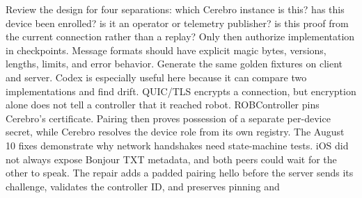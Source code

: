 {}Review the design for four separations:\markdownRendererInterblockSeparator
{}\markdownRendererUlBegin
\markdownRendererUlItem {} which Cerebro instance is this?\markdownRendererUlItemEnd 
\markdownRendererUlItem {} has this device been enrolled?\markdownRendererUlItemEnd 
\markdownRendererUlItem {} is it an operator or telemetry publisher?\markdownRendererUlItemEnd 
\markdownRendererUlItem {} is this proof from the current connection rather than a replay?\markdownRendererUlItemEnd 
\markdownRendererUlEnd \markdownRendererInterblockSeparator
{}Only then authorize implementation in checkpoints.\markdownRendererInterblockSeparator
{}
\markdownRendererSectionEnd \markdownRendererSectionBegin
{}\markdownRendererInterblockSeparator
{}Message formats should have explicit magic bytes, versions, lengths, limits,\markdownRendererSoftLineBreak
{}and error behavior. Generate the same golden fixtures on client and server.\markdownRendererSoftLineBreak
{}Codex is especially useful here because it can compare two implementations and\markdownRendererSoftLineBreak
{}find drift.\markdownRendererInterblockSeparator
{}\markdownRendererInterblockSeparator
{}
\markdownRendererSectionEnd \markdownRendererSectionBegin
{}\markdownRendererInterblockSeparator
{}QUIC/TLS encrypts a connection, but encryption alone does not tell a controller\markdownRendererSoftLineBreak
{}that it reached  robot. ROBController pins Cerebro's certificate. Pairing\markdownRendererSoftLineBreak
{}then proves possession of a separate per-device secret, while Cerebro resolves\markdownRendererSoftLineBreak
{}the device role from its own registry.\markdownRendererParagraphSeparator
{}The August 10 fixes demonstrate why network handshakes need state-machine tests.\markdownRendererSoftLineBreak
{}iOS did not always expose Bonjour TXT metadata, and both peers could wait for\markdownRendererSoftLineBreak
{}the other to speak. The repair adds a padded pairing hello before the server\markdownRendererSoftLineBreak
{}sends its challenge, validates the controller ID, and preserves pinning and\markdownRendererSoftLineBreak
